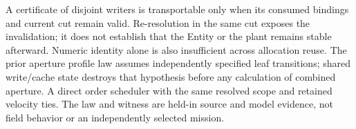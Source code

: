 \documentclass{article}
\begin{document}
A certificate of disjoint writers is transportable only when its
consumed bindings and current cut remain valid. Re-resolution in the
same cut exposes the invalidation; it does not establish that the
Entity or the plant remains stable afterward. Numeric identity alone
is also insufficient across allocation reuse. The prior aperture
profile law assumes independently specified leaf transitions; shared
write/cache state destroys that hypothesis before any calculation
of combined aperture. A direct order scheduler with the same
resolved scope and retained velocity ties. The law and witness are
held-in source and model evidence, not field behavior or an
independently selected mission.
\end{document}
